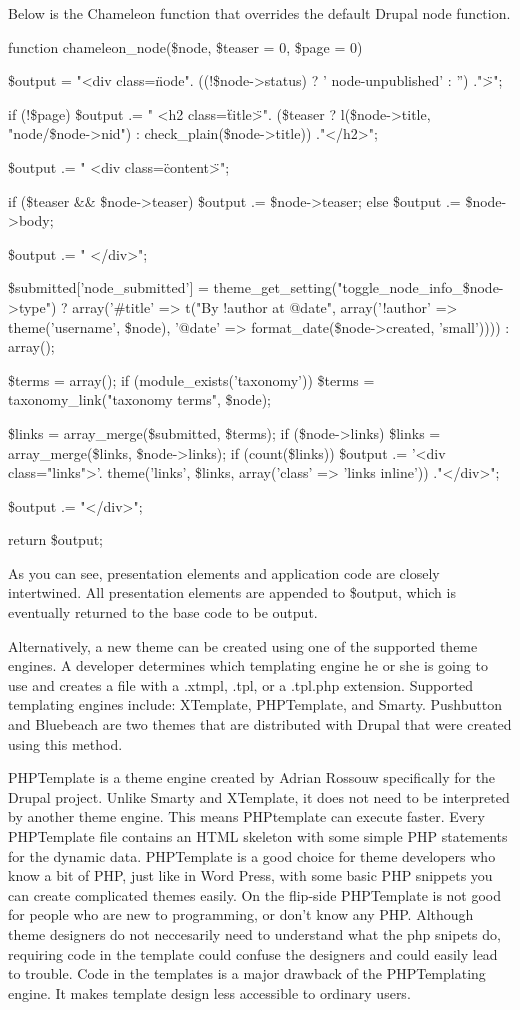\documentclass[a4paper,12pt]{report}
\begin{document}
Below is the Chameleon function that overrides the default Drupal node function.

function chameleon_node(\$node, \$teaser = 0, \$page = 0) {

  \$output  = "<div class=\"node". ((!\$node->status) ? ' node-unpublished' : '') ."\">\n";

  if (!\$page) {
    \$output .= " <h2 class=\"title\">". (\$teaser ? l(\$node->title, "node/\$node->nid") : check_plain(\$node->title)) ."</h2>\n";
  }

  \$output .= " <div class=\"content\">\n";

  if (\$teaser && \$node->teaser) {
    \$output .= \$node->teaser;
  }
  else {
    \$output .= \$node->body;
  }

  \$output .= " </div>\n";

  \$submitted['node_submitted'] = theme_get_setting("toggle_node_info_\$node->type") ? array('#title' => t("By !author at @date", array('!author' => theme('username', \$node), '@date' => format_date(\$node->created, 'small')))) : array();

  \$terms = array();
  if (module_exists('taxonomy')) {
    \$terms = taxonomy_link("taxonomy terms", \$node);
  }

  \$links = array_merge(\$submitted, \$terms);
  if (\$node->links) {
    \$links = array_merge(\$links, \$node->links);
  }
  if (count(\$links)) {
    \$output .= '<div class="links">'. theme('links', \$links, array('class' => 'links inline')) ."</div>\n";
  }

  \$output .= "</div>\n";

  return \$output;
} 

As you can see, presentation elements and application code are closely intertwined. 
All presentation elements are appended to \$output, which is eventually returned to the base code to be output.


Alternatively, a new theme can be created using one of the supported theme engines. 
A developer determines which templating engine he or she is going to use and creates a file with a .xtmpl, .tpl, or a .tpl.php extension. 
Supported templating engines include: XTemplate, PHPTemplate, and Smarty. 
Pushbutton and Bluebeach are two themes that are distributed with Drupal that were created using this method. 

PHPTemplate is a theme engine created by Adrian Rossouw specifically for the Drupal project. 
Unlike Smarty and XTemplate, it does not need to be interpreted by another theme engine. 
This means PHPtemplate can execute faster. 
Every PHPTemplate file contains an HTML skeleton with some simple PHP statements for the dynamic data. 
PHPTemplate is a good choice for theme developers who know a bit of PHP, just like in Word Press, with some basic PHP snippets you can create complicated themes easily. 
On the flip-side PHPTemplate is not good for people who are new to programming, or don't know any PHP. 
Although theme designers do not neccesarily need to understand what the php snipets do, requiring code in the template could confuse the designers and could easily lead to trouble. 
Code in the templates is a major drawback of the PHPTemplating engine. 
It makes template design less accessible to ordinary users. 
\end{document}
